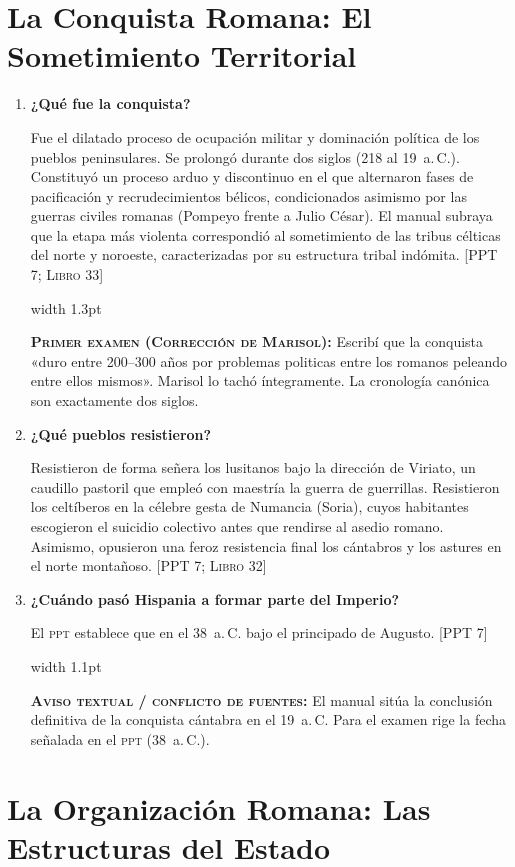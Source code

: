 \documentclass[11pt,letterpaper]{article}
\newcommand{\fuente}[1]{\nolinebreak\hfill{\footnotesize\color{black!55}\textsc{[#1]}}}
\newcommand{\examen}[1]{%
  \par\vspace{0.35em}%
  \noindent\hspace*{0.8em}%
  {\color{goodingCrimson}\vrule width 1.3pt}\hspace{0.7em}%
  \parbox{\dimexpr\linewidth-2.2em}{%
    \footnotesize\color{goodingCrimson}%
    \textbf{\textsc{Primer examen (Corrección de Marisol):}} #1%
  }%
  \par\vspace{0.35em}%
}
\newcommand{\aviso}[1]{%
  \par\vspace{0.3em}%
  \noindent\hspace*{0.8em}%
  {\color{black!40}\vrule width 1.1pt}\hspace{0.7em}%
  \parbox{\dimexpr\linewidth-2.2em}{%
    \footnotesize\color{black!75}%
    \textbf{\textsc{Aviso textual / conflicto de fuentes:}} #1%
  }%
  \par\vspace{0.3em}%
}
\newcommand{\preg}[1]{\item \textbf{#1}\par\nopagebreak\vspace{0.2em}}
\begin{document}
\section{La Conquista Romana: El Sometimiento Territorial}

\begin{enumerate}[resume]
  \preg{¿Qué fue la conquista?}
  Fue el dilatado proceso de ocupación militar y dominación política de los pueblos peninsulares. Se prolongó durante dos siglos (218 al 19~a.\,C.). Constituyó un proceso arduo y discontinuo en el que alternaron fases de pacificación y recrudecimientos bélicos, condicionados asimismo por las guerras civiles romanas (Pompeyo frente a Julio César). El manual subraya que la etapa más violenta correspondió al sometimiento de las tribus célticas del norte y noroeste, caracterizadas por su estructura tribal indómita. \fuente{PPT 7; Libro 33}
  \examen{Escribí que la conquista «duro entre 200--300 años por problemas politicas entre los romanos peleando entre ellos mismos». Marisol lo tachó íntegramente. La cronología canónica son exactamente dos siglos.}

  \preg{¿Qué pueblos resistieron?}
  Resistieron de forma señera los lusitanos bajo la dirección de Viriato, un caudillo pastoril que empleó con maestría la guerra de guerrillas. Resistieron los celtíberos en la célebre gesta de Numancia (Soria), cuyos habitantes escogieron el suicidio colectivo antes que rendirse al asedio romano. Asimismo, opusieron una feroz resistencia final los cántabros y los astures en el norte montañoso. \fuente{PPT 7; Libro 32}

  \preg{¿Cuándo pasó Hispania a formar parte del Imperio?}
  El \textsc{ppt} establece que en el 38~a.\,C. bajo el principado de Augusto. \fuente{PPT 7}
  \aviso{El manual sitúa la conclusión definitiva de la conquista cántabra en el 19~a.\,C. Para el examen rige la fecha señalada en el \textsc{ppt} (38~a.\,C.).}
\end{enumerate}

\section{La Organización Romana: Las Estructuras del Estado}
\end{document}
